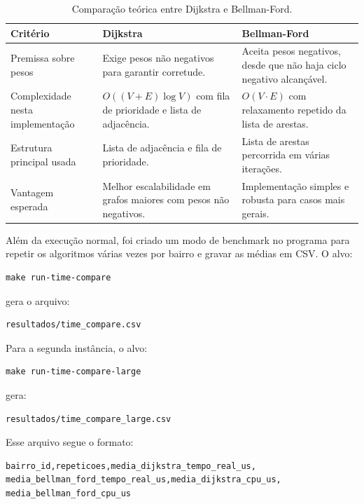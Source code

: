 \documentclass[12pt,a4paper]{article}
\begin{document}
\begin{table}[h]
\centering
\begin{tabular}{p{3.1cm}p{4.2cm}p{4.2cm}}
\toprule
Critério & Dijkstra & Bellman-Ford \\
\midrule
Premissa sobre pesos
    & Exige pesos não negativos para garantir corretude.
    & Aceita pesos negativos, desde que não haja ciclo negativo alcançável. \\
Complexidade nesta implementação
    & $O((V + E)\log V)$ com fila de prioridade e lista de adjacência.
    & $O(V \cdot E)$ com relaxamento repetido da lista de arestas. \\
Estrutura principal usada
    & Lista de adjacência e fila de prioridade.
    & Lista de arestas percorrida em várias iterações. \\
Vantagem esperada
    & Melhor escalabilidade em grafos maiores com pesos não negativos.
    & Implementação simples e robusta para casos mais gerais. \\
\bottomrule
\end{tabular}
\caption{Comparação teórica entre Dijkstra e Bellman-Ford.}
\label{tab:comparacao-teorica}
\end{table}

Além da execução normal, foi criado um modo de benchmark no programa para
repetir os algoritmos várias vezes por bairro e gravar as médias em CSV. O
alvo:

\begin{lstlisting}
make run-time-compare
\end{lstlisting}

gera o arquivo:

\begin{lstlisting}
resultados/time_compare.csv
\end{lstlisting}

Para a segunda instância, o alvo:

\begin{lstlisting}
make run-time-compare-large
\end{lstlisting}

gera:

\begin{lstlisting}
resultados/time_compare_large.csv
\end{lstlisting}

Esse arquivo segue o formato:

\begin{lstlisting}
bairro_id,repeticoes,media_dijkstra_tempo_real_us,
media_bellman_ford_tempo_real_us,media_dijkstra_cpu_us,
media_bellman_ford_cpu_us
\end{lstlisting}
\end{document}
